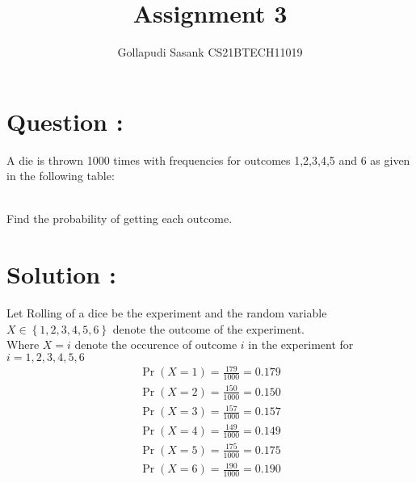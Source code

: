 \documentclass[twocolumn]{article}
\title{Assignment 3}
\author{Gollapudi Sasank CS21BTECH11019}
\providecommand{\pr}[1]{\ensuremath{\Pr\left(#1\right)}}
\providecommand{\cbrak}[1]{\ensuremath{\left\{#1\right\}}}
\begin{document}
\maketitle
\section*{Question : }
A die is thrown 1000 times with frequencies for outcomes 1,2,3,4,5 and 6 as given in the following table:
\begin{table}[ht]

\centering
\caption{}
\label{table:table 1}
\end{table}\\
Find the probability of getting each outcome.
\section*{Solution : }
Let Rolling of a dice be the experiment and the random variable $X \in \cbrak{1,2,3,4,5,6}$  denote the outcome of the experiment.\\
Where $X = i $ denote the occurence of outcome $i$ in the experiment for $ i = 1,2,3,4,5,6 $
\begin{align}
\pr{X = 1} = \frac{179}{1000} = 0.179 \\
\pr{X = 2} = \frac{150}{1000} = 0.150 \\
\pr{X = 3} = \frac{157}{1000} = 0.157 \\
\pr{X = 4} = \frac{149}{1000} = 0.149 \\
\pr{X = 5} = \frac{175}{1000} = 0.175 \\
\pr{X = 6} = \frac{190}{1000} = 0.190 
\end{align}
\end{document}
